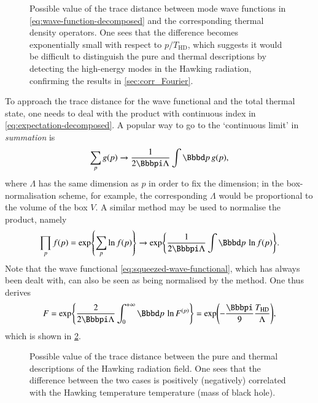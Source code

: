 \begin{figure}
\begin{center}

\end{center}
\caption[Possible value of the trace distance per Fourier mode]{Possible value 
of the trace distance between mode wave functions in 
\cref{eq:wave-function-decomposed} and the corresponding thermal density 
operators. One sees that the difference becomes exponentially small with respect 
to $p/T_\text{HD}$, which suggests it would be difficult to distinguish the pure 
and thermal descriptions by detecting the high-energy modes in the Hawking 
radiation, confirming the results in \cref{sec:corr_Fourier}.
\label{fig:trace-dist-per-mode}}
\end{figure}

To approach the trace distance for the wave functional and the total thermal 
state, one needs to deal with the product with continuous index in 
\cref{eq:expectation-decomposed}. A popular way to go to the `continuous limit' 
in \emph{summation} is
\begin{equation}
\sum_p \rfun{g}{p} \to \frac{1}{2\pp\Lambda} \int \dd p\,\rfun{g}{p},
\end{equation}
where $\Lambda$ has the same dimension as $p$ in order to fix the dimension; in 
the box-normalisation scheme, for example, the corresponding $\Lambda$ would be 
proportional to the volume of the box $V$. A similar method may be used to 
normalise the product, namely
\begin{equation}
\prod_p \rfun{f}{p} = \cfun{\exp}{\sum_p \ln\rfun{f}{p}} \to 
\cfun{\exp}{\frac{1}{2\pp\Lambda}\int \dd p\,\ln\rfun{f}{p}}.
\end{equation}
Note that the wave functional \cref{eq:squeezed-wave-functional}, which has 
always been dealt with, can also be seen as being normalised by the method.
One thus derives
\begin{equation}
F = \cfun{\exp}{\frac{2}{2\pp\Lambda}\int_0^{+\infty}\dd p\,\ln F^\rbr{p}}
= \rfun{\exp}{-\frac{\pp}{9} \frac{T_\text{HD}}{\Lambda}},
\end{equation}
which is shown in \cref{fig:trace-dist-total}.

\begin{figure}
\begin{center}

\end{center}
\caption[Possible value of the trace distance between pure and thermal 
descriptions]{Possible value of the trace distance between the pure and thermal 
descriptions of the Hawking radiation field. One sees that the difference 
between the two cases is positively (negatively) correlated with the Hawking 
temperature temperature (mass of black hole). 
\label{fig:trace-dist-total}}
\end{figure}

